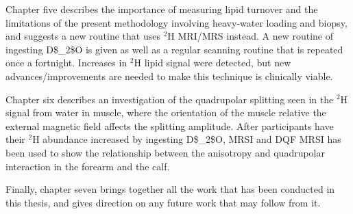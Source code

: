 Chapter five describes the importance of measuring lipid turnover and the limitations of the present methodology involving heavy-water loading and biopsy, and suggests a new routine that uses $^2$H \ac{MRI}/\ac{MRS} instead. A new routine of ingesting \ac{D$_2$O} is given as well as 
 a regular scanning routine that is repeated once a fortnight. Increases in $^2$H lipid signal were detected, but new advances/improvements are needed to make this technique is clinically viable.

Chapter six describes an investigation of the quadrupolar splitting seen in the $^2$H signal from water in muscle, where the orientation of the muscle relative the external magnetic field affects the splitting amplitude. After participants have their $^2$H abundance increased by ingesting \ac{D$_2$O}, \ac{MRSI} and \ac{DQF} \ac{MRSI} has been used to show the relationship between the anisotropy and quadrupolar interaction in the forearm and the calf.

Finally, chapter seven brings together all the work that has been conducted in this thesis, and gives direction on any future work that may follow from it.
